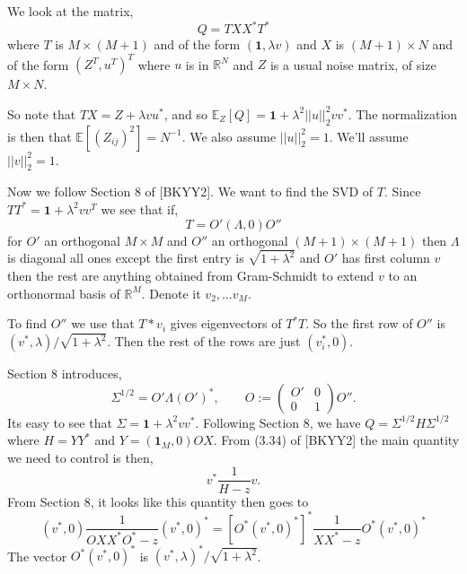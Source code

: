 \documentclass[11 pt, reqno]{article}
\def\beq{\begin{equation}}
\def\eeq{\end{equation}}
\def\rr{\mathbb{R}}
\def\1{\boldsymbol{1}}
\def\ee{\mathrm{E}}
\def\ee{\mathbb{E}}
\begin{document}
We look at the matrix, 
\beq
Q = T X X^* T^*
\eeq
where $T$ is $M \times (M+1)$ and of the form $( \1, \lambda v)$ and $X$ is $(M+1) \times N$ and of the form $(Z^T, u^T)^T$ where $u$ is in $\rr^N$ and $Z$ is a usual noise matrix, of size $M \times N$.  

So note that $TX = Z + \lambda v u^*$, and so $\ee_Z [ Q ] = \1 + \lambda^2 ||u||_2^2 v v^*$.    The normalization is then that $\ee[ (Z_{ij})^2] = N^{-1}$.  We also assume $||u||_2^2 = 1$.  We'll assume $||v||_2^2 = 1$.    

Now we follow Section $8$ of [BKYY2].  We want to find the SVD of $T$.   Since $T T^* = \1 + \lambda^2 v v^T$ we see that if,
\beq
T = O' (\Lambda, 0) O''
\eeq
for $O'$ an orthogonal $M \times M$ and $O''$ an orthogonal $(M+1) \times (M+1)$ then $\Lambda$ is diagonal all ones except the first entry is $\sqrt{1+ \lambda^2}$ and $O'$ has first column $v$ then the rest are anything obtained from Gram-Schmidt to extend $v$ to an orthonormal basis of $\rr^M$.  Denote it $v_2, \dots v_M$.  

To find $O''$ we use that $T* v_i$ gives eigenvectors of $T^* T$.   So the first row of $O''$ is $(v^*, \lambda ) / \sqrt{1+\lambda^2}$.  Then the rest of the rows are just $(v_i^*, 0)$.

Section 8 introduces,
\beq
\Sigma^{1/2} = O' \Lambda (O')^*, \qquad O:= \left( \begin{matrix} O' & 0 \\ 0 & 1 \end{matrix} \right)O''.
\eeq
Its easy to see that $\Sigma = \1 + \lambda^2 v v^*$.  Following Section 8, we have $Q = \Sigma^{1/2} H \Sigma^{1/2}$ where $H = Y Y^*$ and $Y = (\1_M, 0) O X$.  
From (3.34) of [BKYY2] the main quantity we need to control is then,
\beq
v^* \frac{1}{H-z} v.
\eeq
From Section 8, it looks like this quantity then goes to
\beq
(v^*, 0) \frac{1}{ O X X^* O^* - z } (v^*, 0)^* = [ O^* ( v^*, 0)^*]^* \frac{1}{ X X^* - z } O^* ( v^*, 0)^*
\eeq
The vector $O^* (v^*, 0)^*$ is $(v^*, \lambda)^* / \sqrt{1  + \lambda^2}$.  







{}


\begin{comment}
\begin{thebibliography}{9999}
\bibitem[EKYY]{EKYY} Erdos-Knowles-Yau-Yin.  Semicircle for general class




\end{thebibliography}
\end{comment}
\end{document}
